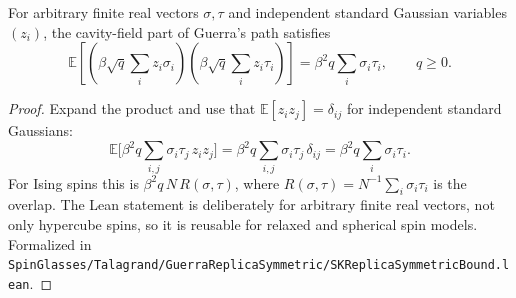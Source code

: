 \begin{lemma}\label{lem:sg-tal:decoupled-covariance}
  \leanok
{}
For arbitrary finite real vectors $\sigma, \tau$ and independent standard Gaussian variables
$(z_i)$, the cavity-field part of Guerra's path satisfies
\[
\mathbb{E}\left[\left(\beta\sqrt{q}\sum_i z_i\sigma_i\right)
  \left(\beta\sqrt{q}\sum_i z_i\tau_i\right)\right]
= \beta^2 q \sum_i \sigma_i\tau_i,
\qquad q \geq 0.
\]
\end{lemma}
\begin{proof}
  \leanok
Expand the product and use that $\mathbb{E}[z_iz_j]=\delta_{ij}$ for independent standard Gaussians:
\[
\mathbb{E}\Big[\beta^2 q\sum_{i,j}\sigma_i\tau_j\,z_iz_j\Big]
=\beta^2 q\sum_{i,j}\sigma_i\tau_j\,\delta_{ij}=\beta^2 q\sum_i\sigma_i\tau_i .
\]
For Ising spins this is $\beta^2 q\,N\,R(\sigma,\tau)$, where $R(\sigma,\tau)=N^{-1}\sum_i\sigma_i\tau_i$ is the overlap.
The Lean statement is deliberately for arbitrary finite real vectors, not only hypercube spins,
so it is reusable for relaxed and spherical spin models.  Formalized in
\texttt{SpinGlasses/Talagrand/GuerraReplicaSymmetric/SKReplicaSymmetricBound.lean}.
\end{proof}

